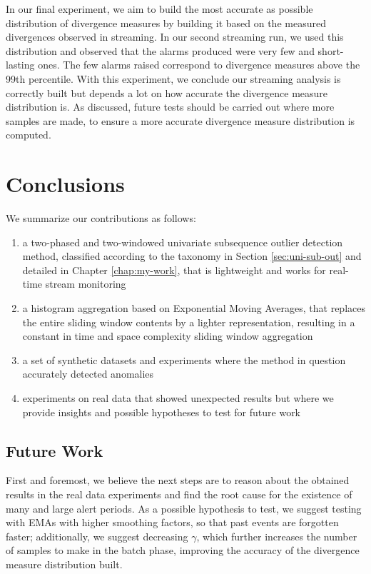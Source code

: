\documentclass[sigconf]{acmart}
\begin{document}
In our final experiment, we aim to build the most accurate as possible distribution of divergence measures by building it based on the measured divergences observed in streaming. In our second streaming run, we used this distribution and observed that the alarms produced were very few and short-lasting ones. The few alarms raised correspond to divergence measures above the 99th percentile. With this experiment, we conclude our streaming analysis is correctly built but depends a lot on how accurate the divergence measure distribution is. As discussed, future tests should be carried out where more samples are made, to ensure a more accurate divergence measure distribution is computed.


\section{Conclusions} \label{sec:Conclusions}
We summarize our contributions as follows:

\begin{enumerate}
    \item a two-phased and two-windowed univariate subsequence outlier detection method, classified according to the taxonomy in Section \ref{sec:uni-sub-out} and detailed in Chapter \ref{chap:my-work}, that is lightweight and works for real-time stream monitoring
    
    \item a histogram aggregation based on Exponential Moving Averages, that replaces the entire sliding window contents by a lighter representation, resulting in a constant in time and space complexity sliding window aggregation
    
    \item a set of synthetic datasets and experiments where the method in question accurately detected anomalies
    
    \item experiments on real data that showed unexpected results but where we provide insights and possible hypotheses to test for future work
\end{enumerate}

\subsection{Future Work}

First and foremost, we believe the next steps are to reason about the obtained results in the real data experiments and find the root cause for the existence of many and large alert periods. As a possible hypothesis to test, we suggest testing with EMAs with higher smoothing factors, so that past events are forgotten faster; additionally, we suggest decreasing $\gamma$, which further increases the number of samples to make in the batch phase, improving the accuracy of the divergence measure distribution built.
\end{document}
